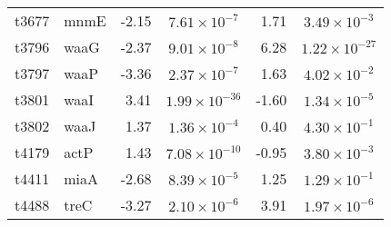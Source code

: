 \begin{table}
\begin{tabular}{ l
    				l
				r
    				c
				r
				c
				}
    t3677 & mnmE & -2.15 & $7.61\times10^{-7}$ & 1.71 & $3.49\times10^{-3}$\\
    t3796 & waaG & -2.37 & $9.01\times10^{-8}$ & 6.28 & $1.22\times10^{-27}$\\
    t3797 & waaP & -3.36 & $2.37\times10^{-7}$ & 1.63 & $4.02\times10^{-2}$\\
    t3801 & waaI & 3.41 & $1.99\times10^{-36}$ & -1.60 & $1.34\times10^{-5}$\\
    t3802 & waaJ & 1.37 & $1.36\times10^{-4}$ & 0.40 & $4.30\times10^{-1}$\\
    t4179 & actP & 1.43 & $7.08\times10^{-10}$ & -0.95 & $3.80\times10^{-3}$\\
    t4411 & miaA & -2.68 & $8.39\times10^{-5}$ & 1.25 & $1.29\times10^{-1}$\\
    t4488 & treC & -3.27 & $2.10\times10^{-6}$ & 3.91 & $1.97\times10^{-6}$\\
    \bottomrule
    \end{tabular}%
    \label{tab:typhi}%
\end{table}

